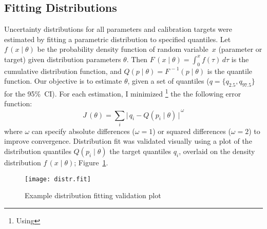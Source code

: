 \subsection{Fitting Distributions}\label{app.model.math.fit}
Uncertainty distributions for all parameters and calibration targets were estimated by
fitting a parametric distribution to specified quantiles.
Let $f\,(x\mid\theta)$ be
the probability density function of random variable~$x$ (parameter or target)
given distribution parameters $\theta$.
Then $F\,(x\mid\theta) = \int_0^x f(\tau)\,d\tau$ is the cumulative distribution function,
and $Q(p\mid\theta) = F^{\,-1}(p\mid\theta)$ is the quantile function.
Our objective is to estimate $\theta$, given a set of quantiles
(\eg $q = \{q_{2.5},q_{97.5}\}$ for the 95\%~CI).
For each estimation, I minimized%
\footnote{Using }
the the following error function:
\begin{equation}
  J\,(\theta) = \sum_i {\big|\,q_i - Q(p_i\mid\theta)\,\big|}^{\,\omega}
\end{equation}
where $\omega$ can specify absolute differences ($\omega=1$) or squared differences ($\omega=2$)
to improve convergence.
Distribution fit was validated visually using a plot of
the distribution quantiles $Q(p_i\mid\theta)$ \vs the target quantiles $q_i$,
overlaid on the density distribution $f\,(x\mid\theta)$; \eg Figure~\ref{fig:distr.fit}.
\begin{figure}[h]
  \centering
  \texttt{[image: distr.fit]}
  \caption{Example distribution fitting validation plot}
  \label{fig:distr.fit}
\end{figure}
